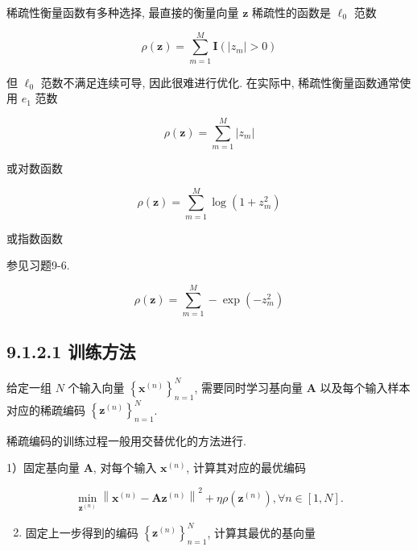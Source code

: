 \documentclass[10pt]{article}
\begin{document}
稀疏性衡量函数有多种选择, 最直接的衡量向量 $\boldsymbol{z}$ 稀疏性的函数是 $\ell_{0}$ 范数


\begin{equation*}
\rho(\boldsymbol{z})=\sum_{m=1}^{M} \mathbf{I}\left(\left|z_{m}\right|>0\right) \tag{9.12}
\end{equation*}


但 $\ell_{0}$ 范数不满足连续可导, 因此很难进行优化. 在实际中, 稀疏性衡量函数通常使用 $e_{1}$ 范数


\begin{equation*}
\rho(\boldsymbol{z})=\sum_{m=1}^{M}\left|z_{m}\right| \tag{9.13}
\end{equation*}


或对数函数


\begin{equation*}
\rho(\boldsymbol{z})=\sum_{m=1}^{M} \log \left(1+z_{m}^{2}\right) \tag{9.14}
\end{equation*}


或指数函数

参见习题9-6.


\begin{equation*}
\rho(\boldsymbol{z})=\sum_{m=1}^{M}-\exp \left(-z_{m}^{2}\right) \tag{9.15}
\end{equation*}


\subsection*{9.1.2.1 训练方法}
给定一组 $N$ 个输入向量 $\left\{\boldsymbol{x}^{(n)}\right\}_{n=1}^{N}$, 需要同时学习基向量 $\boldsymbol{A}$ 以及每个输入样本对应的稀疏编码 $\left\{\boldsymbol{z}^{(n)}\right\}_{n=1}^{N}$.

稀疏编码的训练过程一般用交替优化的方法进行.

1）固定基向量 $\boldsymbol{A}$, 对每个输入 $\boldsymbol{x}^{(n)}$, 计算其对应的最优编码


\begin{equation*}
\min _{\boldsymbol{z}^{(n)}}\left\|\boldsymbol{x}^{(n)}-\boldsymbol{A} \boldsymbol{z}^{(n)}\right\|^{2}+\eta \rho\left(\boldsymbol{z}^{(n)}\right), \forall n \in[1, N] . \tag{9.16}
\end{equation*}


\begin{enumerate}
  \setcounter{enumi}{1}
  \item 固定上一步得到的编码 $\left\{\boldsymbol{z}^{(n)}\right\}_{n=1}^{N}$, 计算其最优的基向量
\end{enumerate}
\end{document}
